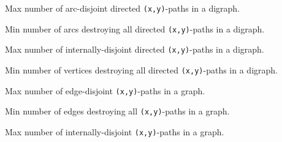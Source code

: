 \begin{definition}
\label{Networks.maxArcDisjointDirectedPaths}
Max number of arc-disjoint directed \texttt{(x,y)}-paths in a digraph.
\end{definition}

\begin{definition}
\label{Networks.minArcsDestroyingDirectedPaths}
Min number of arcs destroying all directed \texttt{(x,y)}-paths in a digraph.
\end{definition}

\begin{definition}
\label{Networks.maxInternallyDisjointDirectedPaths}
Max number of internally-disjoint directed \texttt{(x,y)}-paths in a digraph.
\end{definition}

\begin{definition}
\label{Networks.minVerticesDestroyingDirectedPaths}
Min number of vertices destroying all directed \texttt{(x,y)}-paths in a digraph.
\end{definition}

\begin{definition}
\label{Networks.maxEdgeDisjointPaths}
Max number of edge-disjoint \texttt{(x,y)}-paths in a graph.
\end{definition}

\begin{definition}
\label{Networks.minEdgesDestroyingPaths}
Min number of edges destroying all \texttt{(x,y)}-paths in a graph.
\end{definition}

\begin{definition}
\label{Networks.maxInternallyDisjointPaths}
Max number of internally-disjoint \texttt{(x,y)}-paths in a graph.
\end{definition}

